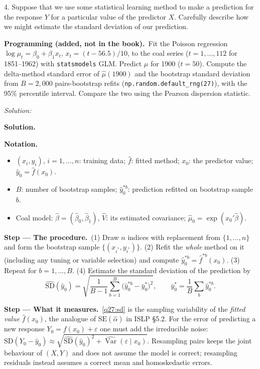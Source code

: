\documentclass[11pt,a4paper]{article}
\newif\ifsolucoes
\newcommand{\espacoresol}{4.5cm}   %
\numberwithin{equation}{questao}   %
\newcommand{\programacao}{\par\smallskip\noindent\textbf{Programming (added, not in the book).}~}
\newenvironment{notacao}{\par\smallskip\noindent\textbf{Notation.}\begin{itemize}[leftmargin=1.4em,topsep=1pt,itemsep=0pt]\small}{\end{itemize}}
\newcommand{\resolespaco}{\ifsolucoes\else\par\textit{Solution:}\vspace{\espacoresol}\par\fi}
\newcommand{\passo}[2]{\par\smallskip\noindent\textbf{Step --- #1.}~#2}
\newcommand{\solhead}{\par\medskip\noindent{\color{blue!55!black}\rule{\linewidth}{0.3pt}}\par\noindent\textbf{Solution.}}
\newcommand{\Var}{\operatorname{Var}}
\newcommand{\1}{\mathbf{1}}
\begin{document}
4. Suppose that we use some statistical learning method to make a prediction for the response $Y$
for a particular value of the predictor $X$. Carefully describe how we might estimate the standard
deviation of our prediction.
\programacao Fit the Poisson regression $\log\mu_t=\beta_0+\beta_1x_t$, $x_t=(t-56.5)/10$, to the coal
series ($t=1,\dots,112$ for 1851--1962) with \texttt{statsmodels} GLM. Predict $\mu$ for 1900
($t=50$). Compute the delta-method standard error of $\hat\mu(1900)$ and the bootstrap standard
deviation from $B=2{,}000$ pairs-bootstrap refits (\texttt{np.random.default\_rng(27)}), with the
95\% percentile interval. Compare the two using the Pearson dispersion statistic.
\resolespaco
\begin{sol}
\solhead
\begin{notacao}
\item $(x_i,y_i)$, $i=1,\dots,n$: training data; $\hat f$: fitted method; $x_0$: the predictor value; $\hat y_0=\hat f(x_0)$.
\item $B$: number of bootstrap samples; $\hat y_0^{*b}$: prediction refitted on bootstrap sample $b$.
\item Coal model: $\hat\beta=(\hat\beta_0,\hat\beta_1)$, $\hat V$: its estimated covariance; $\hat\mu_0=\exp(x_0'\hat\beta)$.
\end{notacao}

\passo{The procedure}{(1) Draw $n$ indices with replacement from $\{1,\dots,n\}$ and form the
bootstrap sample $\{(x_{i^*},y_{i^*})\}$. (2) Refit the \emph{whole} method on it (including any
tuning or variable selection) and compute $\hat y_0^{*b}=\hat f^{*b}(x_0)$. (3) Repeat for
$b=1,\dots,B$. (4) Estimate the standard deviation of the prediction by}
\begin{equation}\label{q27:sd}
\widehat{\mathrm{SD}}(\hat y_0)=\sqrt{\frac1{B-1}\sum_{b=1}^B\big(\hat y_0^{*b}-\bar y_0^{*}\big)^2},\qquad
\bar y_0^*=\frac1B\sum_b\hat y_0^{*b}.
\end{equation}

\passo{What it measures}{\eqref{q27:sd} is the sampling variability of the \emph{fitted value}
$\hat f(x_0)$, the analogue of $\mathrm{SE}(\hat\alpha)$ in ISLP §5.2. For the error of predicting
a new response $Y_0=f(x_0)+\varepsilon$ one must add the irreducible noise:
$\mathrm{SD}(Y_0-\hat y_0)\approx\sqrt{\widehat{\mathrm{SD}}(\hat y_0)^2+\widehat{\Var}(\varepsilon\mid x_0)}$.
Resampling pairs keeps the joint behaviour of $(X,Y)$ and does not assume the model is correct;
resampling residuals instead assumes a correct mean and homoskedastic errors.}


\end{sol}
\end{document}
